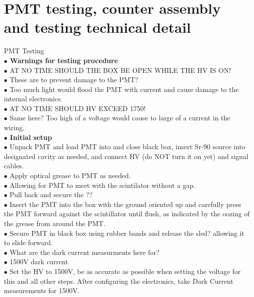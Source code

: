 \section{PMT testing, counter assembly and testing technical detail}

PMT Testing\\

\textbf{\color[rgb]{1,0.5,0}$\bullet$ Warnings for testing procedure}\\
$\bullet$ AT NO TIME SHOULD THE BOX BE OPEN WHILE THE HV IS ON!\\
{\color{blue}$\bullet$ These are to prevent damage to the PMT?} \\
{\color{blue}$\bullet$ Too much light would flood the PMT with current and cause damage to the internal electronics.} \\
$\bullet$ AT NO TIME SHOULD HV EXCEED 1750!\\
{\color{blue}$\bullet$ Same here? Too high of a voltage would cause to large of a current in the wiring.} \\

\textbf{\color[rgb]{1,0.5,0}$\bullet$ Initial setup}\\
$\bullet$ Unpack PMT and load PMT into and close black box, insert Sr-90 source into designated cavity as needed, and connect HV (do NOT turn it on yet) and signal cables.\\
$\bullet$ Apply optical grease to PMT as needed.\\
{\color{blue}$\bullet$ Allowing for PMT to meet with the scintilator without a gap.}\\
$\bullet$ Pull back and secure the {\color{red} ??}\\
$\bullet$ Insert the PMT into the box with the ground oriented up and carefully press the PMT forward against the scintillator until flush, as indicated by the oozing of the grease from around the PMT.\\
$\bullet$ Secure PMT in black box using rubber bands and release the {\color{red}sled?} allowing it to slide forward.\\
{\color{blue}$\bullet$ What are the dark current measurments here for?} \\
$\bullet$ 1500V dark current\\
$\bullet$ Set the HV to 1500V, be as accurate as possible when setting the voltage for this and all other steps. After configuring the electronics, take Dark Current measurements for 1500V.\\

